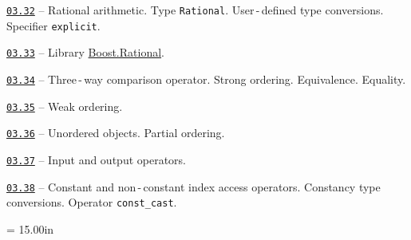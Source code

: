 \documentclass[a4paper,12pt]{article}
\renewenvironment{itemize}
{
    \begin{list}{\labelitemi}
    {
      \setlength{\topsep}{0pt}
      \setlength{\partopsep}{0pt}
      \setlength{\parskip}{0pt}
      \setlength{\itemsep}{0pt}
      \setlength{\parsep}{0pt}
      \setlength{\leftmargin}{14.5pt}
    }
}{\end{list}}
\begin{document}
\medskip\smallskip

\begin{itemize}

    \item \href{https://github.com/i-s-m-mipt/Education/blob/master/projects/examples/source/03.32.cpp}{\texttt{03.32}} -- Rational arithmetic. Type \lstinline{Rational}. User\,-\,defined type conversions. Specifier \lstinline{explicit}.

    \smallskip

    \item \href{https://github.com/i-s-m-mipt/Education/blob/master/projects/examples/source/03.33.cpp}{\texttt{03.33}} -- Library \href{https://www.boost.org/doc/libs/1_75_0/libs/rational/rational.html}{Boost.Rational}.

    \smallskip

    \item \href{https://github.com/i-s-m-mipt/Education/blob/master/projects/examples/source/03.34.cpp}{\texttt{03.34}} -- Three\,-\,way comparison operator. Strong ordering. Equivalence. Equality.

    \smallskip

    \item \href{https://github.com/i-s-m-mipt/Education/blob/master/projects/examples/source/03.35.cpp}{\texttt{03.35}} -- Weak ordering.

    \smallskip

    \item \href{https://github.com/i-s-m-mipt/Education/blob/master/projects/examples/source/03.36.cpp}{\texttt{03.36}} -- Unordered objects. Partial ordering.

    \smallskip

    \item \href{https://github.com/i-s-m-mipt/Education/blob/master/projects/examples/source/03.37.cpp}{\texttt{03.37}} -- Input and output operators.

    \smallskip

    \item \href{https://github.com/i-s-m-mipt/Education/blob/master/projects/examples/source/03.38.cpp}{\texttt{03.38}} -- Constant and non\,-\,constant index access operators. Constancy type conversions. Operator \lstinline{const_cast}.

\end{itemize}



\newpage\thispagestyle{empty}\pdfpageheight = 15.00in\enlargethispage{100in}
\end{document}
